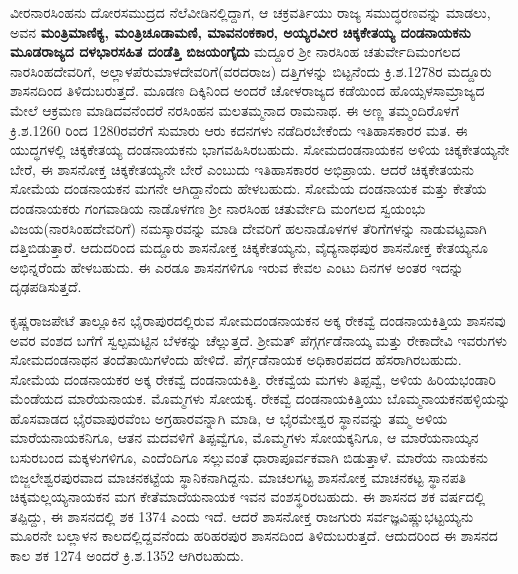 ವೀರನಾರಸಿಂಹನು ದೋರಸಮುದ್ರದ ನೆಲೆವೀಡಿನಲ್ಲಿದ್ದಾಗ, ಆ ಚಕ್ರವರ್ತಿಯು ರಾಜ್ಯ ಸಮುದ್ಧರಣವನ್ನು ಮಾಡಲು, ಅವನ \textbf{ಮಂತ್ರಿಮಾಣಿಕ್ಯ, ಮಂತ್ರಿಚೂಡಾಮಣಿ, ಮಾವನಂಕಕಾರ, ಅಯ್ಯರವೀರ ಚಿಕ್ಕಕೇತಯ್ಯ ದಂಡನಾಯಕನು ಮೂಡರಾಜ್ಯದ ದಳಭಾರಸಹಿತ ದಂಡೆತ್ತಿ ಬಿಜಯಂಗೈದು} ಮದ್ದೂರ ಶ‍್ರೀ ನಾರಸಿಂಹ ಚತುರ್ವೇದಿಮಂಗಲದ ನಾರಸಿಂಹ\-ದೇವರಿಗೆ, ಅಲ್ಲಾಳಪೆರುಮಾಳದೇವರಿಗೆ(ವರದರಾಜ) ದತ್ತಿಗಳನ್ನು ಬಿಟ್ಟನೆಂದು ಕ್ರಿ.ಶ.1278ರ ಮದ್ದೂರು ಶಾಸನದಿಂದ ತಿಳಿದುಬರುತ್ತದೆ. ಮೂಡಣ ದಿಕ್ಕಿನಿಂದ ಅಂದರೆ ಚೋಳರಾಜ್ಯದ ಕಡೆಯಿಂದ ಹೊಯ್ಸಳಸಾಮ್ರಾಜ್ಯದ ಮೇಲೆ ಆಕ್ರಮಣ ಮಾಡಿದವನೆಂದರೆ ನರಸಿಂಹನ ಮಲತಮ್ಮನಾದ ರಾಮನಾಥ. ಈ ಅಣ್ಣ ತಮ್ಮಂದಿರೊಳಗೆ ಕ್ರಿ.ಶ.1260 ರಿಂದ 1280ರವರೆಗೆ ಸುಮಾರು ಆರು ಕದನಗಳು ನಡೆದಿರಬೇಕೆಂದು ಇತಿಹಾಸಕಾರರ ಮತ. ಈ ಯುದ್ಧಗಳಲ್ಲಿ ಚಿಕ್ಕಕೇತಯ್ಯ ದಂಡನಾಯಕನು ಭಾಗವಹಿಸಿರಬಹುದು. ಸೋಮದಂಡನಾಯಕನ ಅಳಿಯ ಚಿಕ್ಕಕೇತಯ್ಯನೇ ಬೇರೆ, ಈ ಶಾಸನೋಕ್ತ ಚಿಕ್ಕಕೇತಯ್ಯನೇ ಬೇರೆ ಎಂಬುದು ಇತಿಹಾಸಕಾರರ ಅಭಿಪ್ರಾಯ. ಆದರೆ ಚಿಕ್ಕಕೇತಯನು ಸೋಮೆಯ ದಂಡನಾಯಕನ ಮಗನೇ ಆಗಿದ್ದಾನೆಂದು ಹೇಳಬಹುದು. ಸೋಮೆಯ ದಂಡನಾಯಕ ಮತ್ತು ಕೇತೆಯ ದಂಡನಾಯಕರು ಗಂಗವಾಡಿಯ ನಾಡೊಳಗಣ ಶ‍್ರೀ ನಾರಸಿಂಹ ಚತುರ್ವೇದಿ ಮಂಗಲದ ಸ್ವಯಂಭು ವಿಜಯ(ನಾರಸಿಂಹದೇವರಿಗೆ) ನಮಸ್ಕಾರವನ್ನು ಮಾಡಿ ದೇವರಿಗೆ ಹಲನಾಡೊಳಗಳ ತೆರಿಗೆಗಳನ್ನು ನಾಡುವಟ್ಟವಾಗಿ ದತ್ತಿಬಿಡುತ್ತಾರೆ. ಆದುದರಿಂದ ಮದ್ದೂರು ಶಾಸನೋಕ್ತ ಚಿಕ್ಕಕೇತಯ್ಯನು, ವೈದ್ಯನಾಥಪುರ ಶಾಸನೋಕ್ತ ಕೇತಯ್ಯನೂ ಅಭಿನ್ನರೆಂದು ಹೇಳಬಹುದು. ಈ ಎರಡೂ ಶಾಸನಗಳಿಗೂ ಇರುವ ಕೇವಲ ಎಂಟು ದಿನಗಳ ಅಂತರ ಇದನ್ನು ದೃಢಪಡಿಸುತ್ತದೆ.

\vskip 2pt

ಕೃಷ್ಣರಾಜಪೇಟೆ ತಾಲ್ಲೂಕಿನ ಭೈರಾಪುರದಲ್ಲಿರುವ ಸೋಮದಂಡನಾಯಕನ ಅಕ್ಕ ರೇಕವ್ವೆ ದಂಡನಾಯಕಿತ್ತಿಯ ಶಾಸನವು ಅವರ ವಂಶದ ಬಗೆಗೆ ಸ್ವಲ್ಪಮಟ್ಟಿನ ಬೆಳಕನ್ನು ಚೆಲ್ಲುತ್ತದೆ. ಶ‍್ರೀಮತ್​ ಪೆಗ್ಗರ್ಗಡೆನಾಯ್ಕ ಮತ್ತು ರೇಕಾದೇವಿ ಇವರುಗಳು ಸೋಮದಂಡನಾಥನ ತಂದೆತಾಯಿಗಳೆಂದು ಹೇಳಿದೆ. ಪೆರ್ಗ್ಗಡೆನಾಯಕ ಅಧಿಕಾರಪದದ ಹೆಸರಾಗಿರಬಹುದು. ಸೋಮೆಯ ದಂಡನಾಯಕರ ಅಕ್ಕ ರೇಕವ್ವೆ ದಂಡನಾಯಕಿತ್ತಿ. ರೇಕವ್ವೆಯ ಮಗಳು ತಿಪ್ಪವ್ವೆ, ಅಳಿಯ ಹಿರಿಯಭಂಡಾರಿ ಮೆಂಡೆಯದ ಮಾರೆಯನಾಯಕ. ಮೊಮ್ಮಗಳು ಸೋಯಕ್ಕ. ರೇಕವ್ವೆ ದಂಡನಾಯಕಿತ್ತಿಯು ಬೊಮ್ಮನಾಯಕನಹಳ್ಳಿಯನ್ನು ಹೊಸವಾಡದ ಭೈರವಾಪುರವೆಂಬ ಅಗ್ರಹಾರವನ್ನಾಗಿ ಮಾಡಿ, ಆ ಭೈರಮೇಶ್ವರ ಸ್ಥಾನವನ್ನು ತಮ್ಮ ಅಳಿಯ ಮಾರೆಯನಾಯಕ\-ನಿಗೂ, ಆತನ ಮದವಳಿಗೆ ತಿಪ್ಪವ್ವೆಗೂ, ಮೊಮ್ಮಗಳು ಸೋಯಕ್ಕನಿಗೂ, ಆ ಮಾರೆಯನಾಯ್ಕನ ಬಸುರಬಂದ ಮಕ್ಕಳುಗಳಿಗೂ, ಎಂದೆಂದಿಗೂ ಸಲ್ಲುವಂತೆ ಧಾರಾಪೂರ್ವಕವಾಗಿ ಬಿಡುತ್ತಾಳೆ. ಮಾರೆಯ ನಾಯಕನು ಬಿಜ್ಜಲೇಶ್ವರಪುರವಾದ ಮಾಚನಕಟ್ಟೆಯ ಸ್ಥಾನಿಕನಾಗಿದ್ದನು. ಮಾಚಲಗಟ್ಟ ಶಾಸನೋಕ್ತ ಮಾಚನಕಟ್ಟ ಸ್ಥಾನಪತಿ ಚಿಕ್ಕಮಲ್ಲಯ್ಯನಾಯಕನ ಮಗ ಕೇತೆಮಾದೆಯನಾಯಕ ಇವನ ವಂಶಸ್ಥರಿರಬಹುದು. ಈ ಶಾಸನದ ಶಕ ವರ್ಷದಲ್ಲಿ ತಪ್ಪಿದ್ದು, ಈ ಶಾಸನದಲ್ಲಿ ಶಕ 1374 ಎಂದು ಇದೆ. ಆದರೆ ಶಾಸನೋಕ್ತ ರಾಜಗುರು ಸರ್ವಜ್ಞವಿಷ್ಣುಭಟ್ಟಯ್ಯನು ಮೂರನೇ ಬಲ್ಲಾಳನ ಕಾಲದಲ್ಲಿದ್ದವನೆಂದು ಹರಿಹರಪುರ ಶಾಸನದಿಂದ ತಿಳಿದುಬರುತ್ತದೆ. ಆದುದರಿಂದ ಈ ಶಾಸನದ ಕಾಲ ಶಕ 1274 ಅಂದರೆ ಕ್ರಿ.ಶ.1352 ಆಗಿರಬಹುದು.

